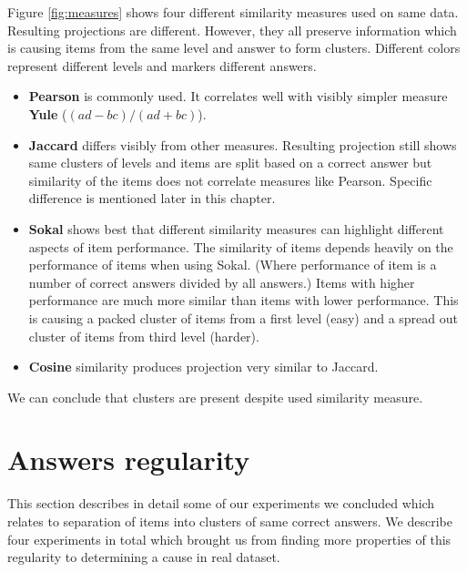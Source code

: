 \documentclass[
  digital, %
  table,   %
  nolof,     %
  nolot,     %
  nocover,
  color,
  final, %
]{fithesis3}
\begin{document}

Figure \ref{fig:measures} shows four different similarity measures used on same data. Resulting projections are different. However, they all preserve information which is causing items from the same level and answer to form clusters. Different colors represent different levels and markers different answers.

\begin{itemize}
\item
  \textbf{Pearson} is commonly used. It correlates well with visibly simpler measure \textbf{Yule} ($(ad-bc)/(ad+bc)$).

\item
  \textbf{Jaccard} differs visibly from other measures. Resulting projection still shows same clusters of levels and items are split based on a correct answer but similarity of the items does not correlate measures like Pearson. Specific difference is mentioned later in this chapter.

\item
  \textbf{Sokal} shows best that different similarity measures can highlight different aspects of item performance. The similarity of items depends heavily on the performance of items when using Sokal. (Where performance of item is a number of correct answers divided by all answers.) Items with higher performance are much more similar than items with lower performance. This is causing a packed cluster of items from a first level (easy) and a spread out cluster of items from third level (harder).

\item
  \textbf{Cosine} similarity produces projection very similar to Jaccard.
\end{itemize}

We can conclude that clusters are present despite used similarity measure.


\section{Answers regularity}\label{evaulation-answers-regularity}

This section describes in detail some of our experiments we concluded which relates to separation of items into clusters of same correct answers. We describe four experiments in total which brought us from finding more properties of this regularity to determining a cause in real dataset.
\end{document}

